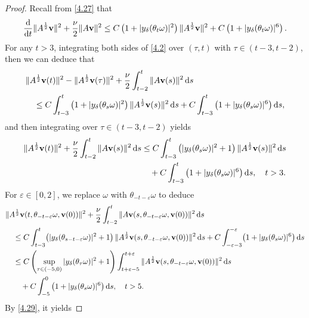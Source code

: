 \documentclass{elsarticle}
\theoremstyle{definition}
\numberwithin{equation}{section}
\renewcommand{\d}{{\rm{d}}}
\begin{document}
\begin{proof}
Recall from \eqref{4.27} that
\begin{align}\label{4.2}
\frac{\d}{\d t}\|A^{\frac12}\textbf{v}\|^2 + \frac{\nu}{2} \|A\textbf{v}\|^2
 \leq  C\left ( 1 +  |y_\delta(\theta_t\omega)|^2 \right)  \|A^{\frac12}\textbf{v}\|^2  +
C \left(1 +|y_\delta(\theta_t\omega)|^6  \right).
\end{align}
For any $t>3$,  integrating both sides of \eqref{4.2} over $(\tau, t)$ with $\tau\in (t-3,t-2)$, then we can deduce that
\begin{align*}
&
\|A^{\frac12}\textbf{v} (t) \|^2 -\|A^{\frac12}\textbf{v}(\tau) \|^2  + \frac{\nu }{2}\int^t_{t-2} \|A \textbf{v}(s)\|^2 \, \d s \\
&\quad
 \leq  C \int^t_{t-3} \left(1+  |y_\delta(\theta_s\omega)|^2 \right) \|A^{\frac12}\textbf{v}(s) \|^2\, \d s
+ C\int^t_{t-3} \left(1 +|y_\delta(\theta_s\omega)|^6 \right )  \d s,
\end{align*}
and then integrating over $\tau\in (t-3,t-2)$ yields
\begin{align*}
\|A^{\frac12}\textbf{v} (t) \|^2+  \frac{\nu}{2} \int^t_{t-2} \|A \textbf{v}(s)\|^2\, \d s
& \leq   C \int^t_{t-3} \left (|y_\delta(\theta_s\omega)|^2+1\right)  \|A^{\frac12}\textbf{v}(s) \|^2 \, \d s \\
&\quad + C\int^t_{t-3} \left (1 +|y_\delta(\theta_s\omega)|^6 \right)  \d s ,\quad t> 3.
\end{align*}
For $\varepsilon\in  [0,2]$, we replace $\omega$ with $\theta_{-t-\varepsilon} \omega$  to deduce
\begin{align}
 & \|A^{\frac12}\textbf{v} (t,\theta_{-t-\varepsilon} \omega, \textbf{v}(0)) \|^2 + \frac{ \nu}{2} \int_{t-2}^t  \|A\textbf{v} (s,\theta_{-t-\varepsilon} \omega, \textbf{v}(0)) \|^2 \, \d s \nonumber \\
& \quad \leq   C \int^t_{t-3} \! \left (|y_\delta(\theta_{s-t-\varepsilon} \omega)|^2+1\right)  \|A^{\frac12}\textbf{v}(s,\theta_{-t-\varepsilon} \omega, \textbf{v}(0)) \|^2 \, \d s + C\int^{-\varepsilon}_{-\varepsilon-3} \! \left(1 +|y_\delta(\theta_s\omega)|^6 \right )  \d s\nonumber\\
& \quad \leq   C\left (  \sup_{\tau\in (-5,0)}|y_\delta(\theta_\tau\omega)|^2+1\right) \int^{t+\varepsilon}_{t+\varepsilon-5}  \|A^{\frac12}\textbf{v}(s,\theta_{-t-\varepsilon} \omega, \textbf{v}(0)) \|^2 \, \d s \nonumber\\
&\qquad + C\int^{0}_{-5}    \left(1 +|y_\delta(\theta_s\omega)|^6 \right)   \d s ,\quad t>5 . \label{mar8.1}
\end{align}
By \eqref{4.29}, it yields

\end{proof}
\end{document}
